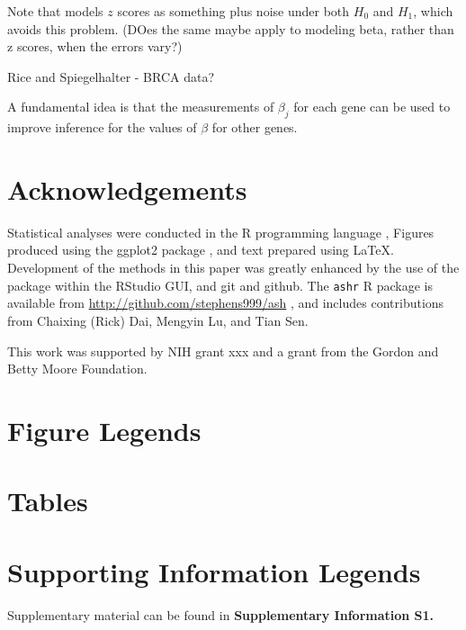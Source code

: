 \documentclass[11pt]{article}
\begin{document}
Note that \cite{muralidharan2010empirical} models $z$ scores as something plus noise under both $H_0$ and $H_1$, which
avoids this problem. (DOes the same maybe apply to modeling beta, rather than z scores, when the errors vary?)

Rice and Spiegelhalter - BRCA data?

A fundamental idea is
that the measurements of $\beta_j$ for each gene can be used to improve inference for the values of $\beta$ for other genes.


\section*{Acknowledgements}

Statistical analyses were conducted in the {\sf R} programming language \cite{Rcore:2012}, Figures produced using the ggplot2 package \cite{ggplot2}, and text
prepared using \LaTeX. Development of the methods in this paper was greatly enhanced by the use of the \cite{knitr} package within the RStudio GUI, and 
git and github. The {\tt ashr} R package is available from \url{http://github.com/stephens999/ash} , and includes contributions 
from Chaixing (Rick) Dai, Mengyin Lu, and Tian Sen. 

This work was supported by NIH grant xxx and a grant from the Gordon and Betty Moore Foundation.




\section*{Figure Legends}


\clearpage

\section*{Tables}

\section*{Supporting Information Legends}

Supplementary material can be found in {\bf Supplementary Information S1.}
\end{document}
